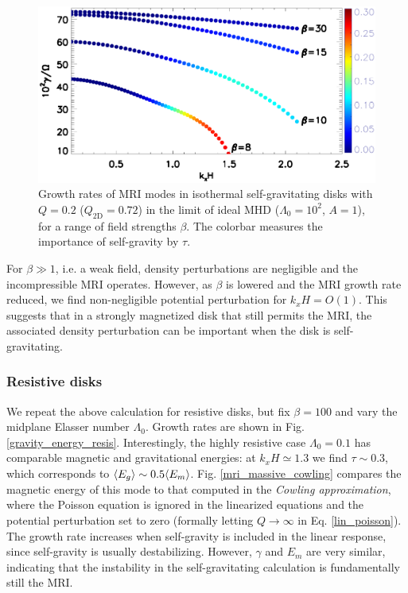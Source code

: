 \begin{figure}
  \includegraphics[width=\linewidth]{figures/compare_energy_ideal}
  \caption{Growth rates of MRI modes in isothermal self-gravitating
    disks with $Q=0.2$ ($Q_\mathrm{2D}=0.72$) in the limit of ideal MHD
    ($\Lambda_0=10^2$, $A=1$), for a range of field strengths $\beta$. The
    colorbar measures the importance of self-gravity by $\tau$.  
    \label{gravity_energy}}
\end{figure}

For $\beta\gg 1$, i.e. a weak field, density perturbations are
negligible and the incompressible MRI operates. However, as $\beta$ is
lowered and the MRI growth rate reduced, we find non-negligible
potential perturbation for $k_xH=O(1)$. This suggests that in a
strongly magnetized disk that still permits the MRI, the associated
density perturbation can be important when the disk is
self-gravitating. %



\subsubsection{Resistive disks}
We repeat the above calculation for resistive disks, but fix
$\beta=100$ and vary the midplane Elasser number $\Lambda_0$. Growth
rates are shown in Fig. \ref{gravity_energy_resis}. 
Interestingly, the highly resistive case $\Lambda_0=0.1$ has
comparable magnetic and gravitational energies: at $k_xH\simeq1.3$ we
find $\tau\sim 0.3$, which corresponds to $\langle{E_g}\rangle\sim 0.5\langle{E_m}\rangle$.  
Fig. \ref{mri_massive_cowling} compares the magnetic
energy of this mode to that computed in the \emph{Cowling  
  approximation}, where the Poisson equation is ignored in the 
linearized equations and the potential perturbation set to zero  
(formally letting $Q\to\infty$ in Eq. \ref{lin_poisson}).  
The growth rate increases when self-gravity is included in the linear
response, since self-gravity is usually destabilizing. However, 
$\gamma$ and $E_m$ are very similar, indicating that the instability
in the self-gravitating calculation is fundamentally still the MRI.   

